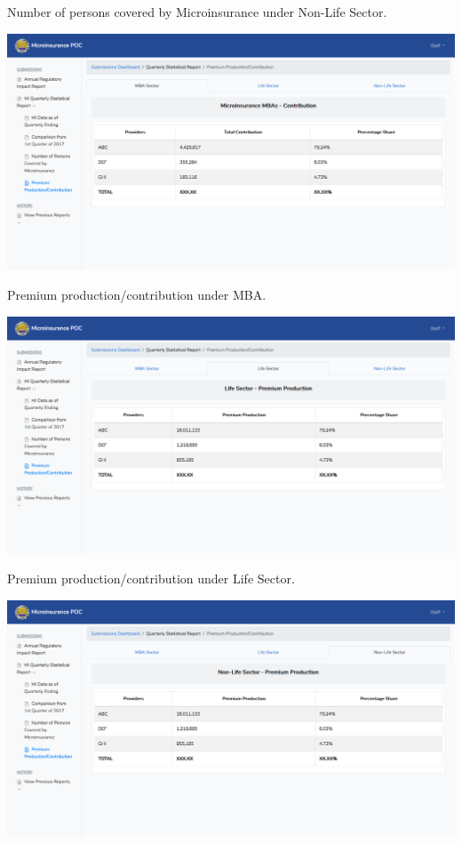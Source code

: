 \documentclass{article}
\begin{document}
Number of persons covered by Microinsurance under
Non-Life Sector.%

\includegraphics[keepaspectratio=true]{up-ic-screens/image212}{}%

Premium production/contribution under MBA.%

\includegraphics[keepaspectratio=true]{up-ic-screens/image155}{}%

Premium production/contribution under Life
Sector.%

\includegraphics[keepaspectratio=true]{up-ic-screens/image83}{}%
\end{document}
